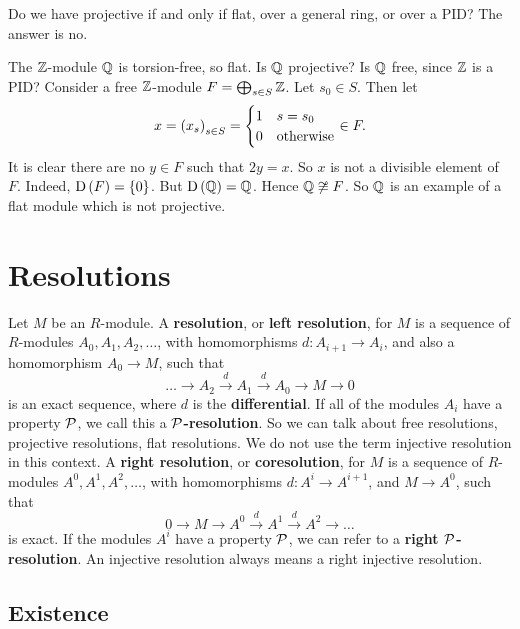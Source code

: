 \begin{example*}
Do we have projective if and only if flat, over a general ring, or over a PID? The answer is no.
\end{example*}

The $ \mathbb{Z} $-module $ \mathbb{Q} $ is torsion-free, so flat. Is $ \mathbb{Q} $ projective? Is $ \mathbb{Q} $ free, since $ \mathbb{Z} $ is a PID? Consider a free $ \mathbb{Z} $-module $ F = \bigoplus_{s \in S} \mathbb{Z} $. Let $ s_0 \in S $. Then let
$$ x = \br{x_s}_{s \in S} =
\begin{cases}
1 & s = s_0 \\
0 & \text{otherwise}
\end{cases}
\in F. $$
It is clear there are no $ y \in F $ such that $ 2y = x $. So $ x $ is not a divisible element of $ F $. Indeed, $ \D\br{F} = \cbr{0} $. But $ \D\br{\QQ} = \QQ $. Hence $ \mathbb{Q} \not\cong F $. So $ \mathbb{Q} $ is an example of a flat module which is not projective.

\pagebreak

\section{Resolutions}

\begin{definition}
Let $ M $ be an $ R $-module. A \textbf{resolution}, or \textbf{left resolution}, for $ M $ is a sequence of $ R $-modules $ A_0, A_1, A_2, \dots $, with homomorphisms $ d : A_{i + 1} \to A_i $, and also a homomorphism $ A_0 \to M $, such that
$$ \dots \to A_2 \xrightarrow{d} A_1 \xrightarrow{d} A_0 \to M \to 0 $$
is an exact sequence, where $ d $ is the \textbf{differential}. If all of the modules $ A_i $ have a property $ \mathcal{P} $, we call this a \textbf{$ \mathcal{P} $-resolution}. So we can talk about free resolutions, projective resolutions, flat resolutions. We do not use the term injective resolution in this context. A \textbf{right resolution}, or \textbf{coresolution}, for $ M $ is a sequence of $ R $-modules $ A^0, A^1, A^2, \dots $, with homomorphisms $ d : A^i \to A^{i + 1} $, and $ M \to A^0 $, such that
$$ 0 \to M \to A^0 \xrightarrow{d} A^1 \xrightarrow{d} A^2 \to \dots $$
is exact. If the modules $ A^i $ have a property $ \mathcal{P} $, we can refer to a \textbf{right $ \mathcal{P} $-resolution}. An injective resolution always means a right injective resolution.
\end{definition}

\subsection{Existence}

